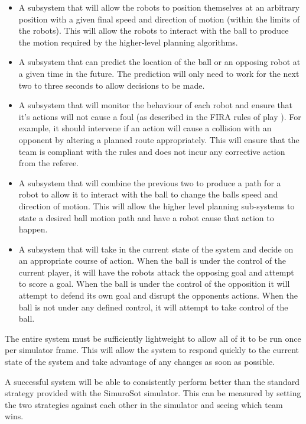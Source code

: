\documentclass[a4paper,10pt]{article}
\begin{document}
\begin{itemize}
\item A subsystem that will allow the robots to position themselves at an arbitrary position with a given final speed and direction of motion (within the limits of the robots).  This will allow the robots to interact with the ball to produce the motion required by the higher-level planning algorithms.

\item A subsystem that can predict the location of the ball or an opposing robot at a given time in the future.  The prediction will only need to work for the next two to three seconds to allow decisions to be made.

\item A subsystem that will monitor the behaviour of each robot and ensure that it's actions will not cause a foul (as described in the FIRA rules of play \cite{firaRules}).  For example, it should intervene if an action will cause a collision with an opponent by altering a planned route appropriately.  This will ensure that the team is compliant with the rules and does not incur any corrective action from the referee.

\item A subsystem that will combine the previous two to produce a path for a robot to allow it to interact with the ball to change the balls speed and direction of motion.  This will allow the higher level planning sub-systems to state a desired ball motion path and have a robot cause that action to happen.

\item A subsystem that will take in the current state of the system and decide on an appropriate course of action. When the ball is under the control of the current player, it will have the robots attack the opposing goal and attempt to score a goal.  When the ball is under the control of the opposition it will attempt to defend its own goal and disrupt the opponents actions. When the ball is not under any defined control, it will attempt to take control of the ball.
\end{itemize}

The entire system must be sufficiently lightweight to allow all of it to be run once per simulator frame.  This will allow the system to respond quickly to the current state of the system and take advantage of any changes as soon as possible.

A successful system will be able to consistently perform better than the standard strategy provided with the SimuroSot simulator.  This can be measured by setting the two strategies against each other in the simulator and seeing which team wins.
\end{document}
